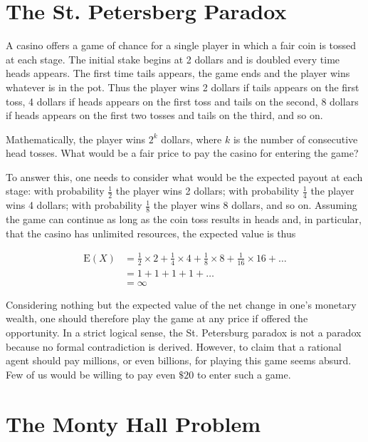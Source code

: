 \documentclass[11pt,a4paper]{book}
\begin{document}
\section{The St. Petersberg Paradox}

A casino offers a game of chance for a single player in which a fair
coin is tossed at each stage. The initial stake begins at 2 dollars
and is doubled every time heads appears. The first time tails appears,
the game ends and the player wins whatever is in the pot. Thus the
player wins 2 dollars if tails appears on the first toss, 4 dollars
if heads appears on the first toss and tails on the second, 8 dollars
if heads appears on the first two tosses and tails on the third, and
so on.

Mathematically, the player wins $2^{k}$ dollars, where $k$ is the
number of consecutive head tosses. What would be a fair price to pay
the casino for entering the game?

To answer this, one needs to consider what would be the expected payout
at each stage: with probability ${\displaystyle \frac{1}{2}}$ the
player wins 2 dollars; with probability ${\displaystyle \frac{1}{4}}$
the player wins 4 dollars; with probability ${\displaystyle \frac{1}{8}}$
the player wins 8 dollars, and so on. Assuming the game can continue
as long as the coin toss results in heads and, in particular, that
the casino has unlimited resources, the expected value is thus

\begin{align*}
\text{E}\left(X\right) & =\frac{1}{2}\times2+\frac{1}{4}\times4+\frac{1}{8}\times8+\frac{1}{16}\times16+\ldots\\
 & =1+1+1+1+\ldots\\
 & =\infty
\end{align*}

Considering nothing but the expected value of the net change in one's
monetary wealth, one should therefore play the game at any price if
offered the opportunity. In a strict logical sense, the St. Petersburg
paradox is not a paradox because no formal contradiction is derived.
However, to claim that a rational agent should pay millions, or even
billions, for playing this game seems absurd. Few of us would be willing
to pay even $\$20$ to enter such a game.

\newpage{}

\section{The Monty Hall Problem}
\end{document}
